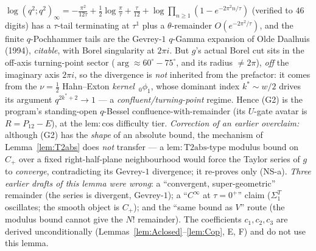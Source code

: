 $\log(q^2;q^2)_\infty=-\tfrac{\pi^2}{12\tau}+\tfrac12\log\tfrac\pi\tau+\tfrac\tau{12}+\log\!\prod_{n\ge1}(1-e^{-2\pi^2n/\tau})$
(verified to $46$ digits) has a $\tau$-tail terminating at $\tau^1$ plus a $\theta$-remainder $O(e^{-2\pi^2/\tau})$,
and the finite $q$-Pochhammer tails are the Gevrey-$1$ $q$-Gamma expansion of Olde Daalhuis (1994), \emph{citable},
with Borel singularity at $2\pi i$. But $g$'s actual Borel cut sits in the off-axis turning-point sector
($\arg\approx60^\circ\!-\!75^\circ$, and its radius $\ne2\pi$), \emph{off} the imaginary axis $2\pi i$, so the
divergence is \emph{not} inherited from the prefactor: it comes from the $\nu=\tfrac12$ Hahn--Exton
\emph{kernel} $\,{}_0\phi_1$, whose dominant index $k^\ast\sim w/2$ drives its argument $q^{2k^\ast+2}\to1$ --- a
\emph{confluent/turning-point} regime. Hence (G2) is the program's standing-open $q$-Bessel confluence-with-remainder
(its $U$-gate avatar is $R=P_{12}-E$), at the $\mathrm{lem:cos}$ difficulty tier. \emph{Correction of an earlier
overclaim:} although (G2) has the \emph{shape} of an absolute bound, the mechanism of Lemma~\ref{lem:T2abs} does
\emph{not} transfer --- a $\mathrm{lem:T2abs}$-type modulus bound on $C_+$ over a fixed right-half-plane neighbourhood
would force the Taylor series of $g$ to \emph{converge}, contradicting its Gevrey-$1$ divergence; it re-proves only
(NS-a). \emph{Three earlier drafts of this lemma were wrong}: a ``convergent, super-geometric'' remainder (the series
is divergent, Gevrey-$1$); a ``$C^\infty$ at $\tau{=}0^+$'' claim ($\Sigma_1^T$ oscillates; the smooth object is
$C_+$); and the ``same bound as $V$'' route (the modulus bound cannot give the $N!$ remainder). The coefficients
$c_1,c_2,c_3$ are derived unconditionally (Lemmas~\ref{lem:Aclosed}--\ref{lem:Cop}, E, F) and do not use this lemma.

